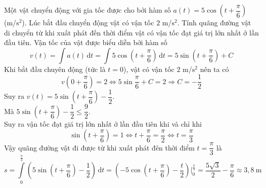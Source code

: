 \begin{ex}%
	Một vật chuyển động với gia tốc được cho bởi hàm số $a(t)=5\cos\left(t+\dfrac{\pi}{6}\right)$ (m/$\mathrm{s}^2$). Lúc bắt đầu chuyển động vật có vận tốc $2$ m/$\mathrm{s}^2$. Tính quãng đường vật di chuyển từ khi xuất phát đến thời điểm vật có vận tốc đạt giá trị lớn nhất ở lần đầu tiên.
	\loigiai
	{Vận tốc của vật được biểu diễn bởi hàm số $$v(t)=\displaystyle\int a(t)\mathrm{\,d}t=\displaystyle\int 5\cos\left(t+\dfrac{\pi}{6}\right)\mathrm{\,d}t=5\sin\left(t+\dfrac{\pi}{6}\right)+C$$
		Khi bắt đầu chuyên động (tức là $t=0$), vật có vận tốc $2$ m/$\mathrm{s}^2$ nên ta có$$v\left(0+\dfrac{\pi}{6}\right)=2\Leftrightarrow 5\sin\dfrac{\pi}{6}+C=2\Rightarrow C=-\dfrac{1}{2}$$
		Suy ra $v(t)=5\sin\left(t+\dfrac{\pi}{6}\right)-\dfrac{1}{2}$.\\
		Mà $5\sin\left(t+\dfrac{\pi}{6}\right)-\dfrac{1}{2}\leq \dfrac{9}{2}$.\\
		Suy ra vận tốc đạt giá trị lớn nhất ở lần đầu tiên khi và chỉ khi $$\sin\left(t+\dfrac{\pi}{6}\right)=1\Leftrightarrow t+\dfrac{\pi}{6}=\dfrac{\pi}{2}\Leftrightarrow t=\dfrac{\pi}{3}$$
		Vậy quãng đường vật đi được từ khi xuất phát đên thời điểm $t=\dfrac{\pi}{3}$ là 
		$$s=\displaystyle\int\limits_{0}^{\frac{\pi}{3}}\left(5\sin\left(t+\dfrac{\pi}{6}\right)-\dfrac{1}{2}\right)\mathrm{\,d}t=\left(-5\cos\left(t+\dfrac{\pi}{6}\right)-\dfrac{t}{2}\right)\Big|_0^{\frac{\pi}{3}}=\dfrac{5\sqrt{3}}{2}-\dfrac{\pi}{6}\approx 3{,}8~\mathrm{m}$$ 
	}
\end{ex}

